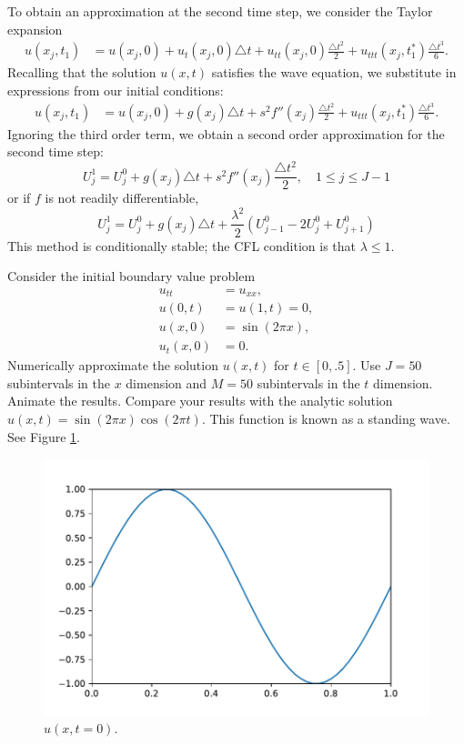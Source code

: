 To obtain an approximation at the second time step, we consider the Taylor expansion
\begin{align*}
	u(x_j,t_1) &= u(x_j, 0) + u_t(x_j,0) \triangle t + u_{tt}(x_j,0) \frac{\triangle t^2}{2} + u_{ttt}(x_j,t_1^*) \frac{\triangle t^3}{6}.
\end{align*}
Recalling that the solution $u(x,t)$ satisfies the wave equation, we substitute in expressions from our initial conditions:
\begin{align*}
	u(x_j,t_1) &= u(x_j, 0) +  g(x_j) \triangle t+ s^2 f''(x_j)\frac{\triangle t^2}{2} +  u_{ttt}(x_j,t_1^*) \frac{\triangle t^3}{6}.
\end{align*}
Ignoring the third order term, we obtain a second order approximation for the second time step:
\[U_{j}^{1}= U_{j}^{0} + g(x_j) \triangle t+ s^2 f''(x_j) \frac{\triangle t^2}{2}, \quad 1 \leq j \leq J-1\]
or if $f$ is not readily differentiable,
\[U_{j}^{1}= U_{j}^{0} + g(x_j) \triangle t+ \frac{\lambda^2}{2} (U^0_{j-1} -2 U^0_j + U^0_{j+1})\]
This method is conditionally stable; the CFL condition is that $\lambda \leq 1$.

\begin{problem}
\label{prob:prob1}
Consider the initial boundary value problem
\begin{align*}
	u_{tt} &= u_{xx}, \\
	u(0,t) &= u(1,t) = 0, \\
	u(x,0) &= \sin(2 \pi x),\\
	u_t(x,0) &= 0.
\end{align*}
Numerically approximate the solution $u(x,t)$ for $t \in \left[0,.5\right]$.
Use $J=50$ subintervals in the $x$ dimension and $M=50$ subintervals in the $t$ dimension.
Animate the results.
Compare your results with the analytic solution $u(x,t) = \sin{(2 \pi x)} \cos{(2 \pi t)}$.
This function is known as a standing wave.
See Figure \ref{fig:prob1}.

\begin{figure}[H]
\centering
\includegraphics[width=\textwidth]{prob1.pdf}
\caption{$u(x,t=0)$.}
\label{fig:prob1}
\end{figure}
\end{problem}

